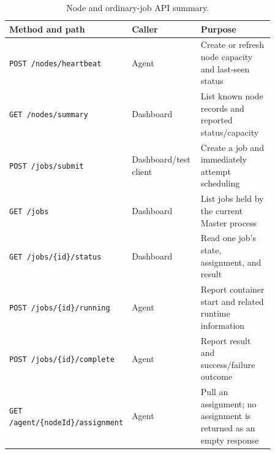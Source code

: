 \documentclass{article}
\begin{document}
\begin{table}[h!]
\centering
\caption{Node and ordinary-job API summary.}
\label{tab:api-jobs}
\begin{tabular}{|p{0.22\linewidth}|p{0.28\linewidth}|p{0.36\linewidth}|}
\hline
Method and path & Caller & Purpose \\
\hline
\texttt{POST /nodes/heartbeat} & Agent & Create or refresh node capacity and last-seen status \\
\hline
\texttt{GET /nodes/summary} & Dashboard & List known node records and reported status/capacity \\
\hline
\texttt{POST /jobs/submit} & Dashboard/test client & Create a job and immediately attempt scheduling \\
\hline
\texttt{GET /jobs} & Dashboard & List jobs held by the current Master process \\
\hline
\texttt{GET /jobs/\{id\}/status} & Dashboard & Read one job's state, assignment, and result \\
\hline
\texttt{POST /jobs/\{id\}/running} & Agent & Report container start and related runtime information \\
\hline
\texttt{POST /jobs/\{id\}/complete} & Agent & Report result and success/failure outcome \\
\hline
\texttt{GET /agent/\{nodeId\}/assignment} & Agent & Pull an assignment; no assignment is returned as an empty response \\
\hline
\end{tabular}
\end{table}
\end{document}
